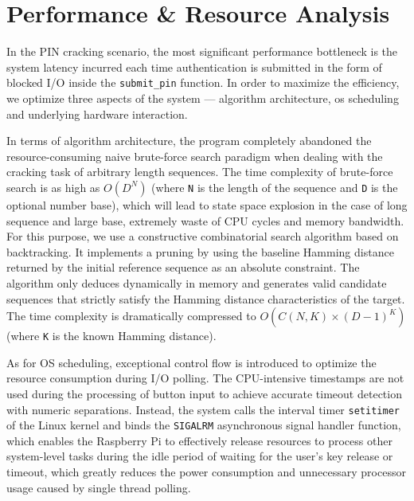 \section{Performance \& Resource Analysis}
\label{sec:performance_analysis}

In the PIN cracking scenario, the most significant performance bottleneck is the system latency incurred each time authentication is submitted in the form of blocked I/O inside the \texttt{submit\_pin} function. In order to maximize the efficiency, we optimize three aspects of the system --- algorithm architecture, os scheduling and underlying hardware interaction.

In terms of algorithm architecture, the program completely abandoned the resource-consuming naive brute-force search paradigm when dealing with the cracking task of arbitrary length sequences. The time complexity of brute-force search is as high as $O(D^N)$ (where \texttt{N} is the length of the sequence and \texttt{D} is the optional number base), which will lead to state space explosion in the case of long sequence and large base, extremely waste of CPU cycles and memory bandwidth. For this purpose, we use a constructive combinatorial search algorithm based on backtracking. It implements   a pruning by using the baseline Hamming distance returned by the initial reference sequence as an absolute constraint. The algorithm only deduces dynamically in memory and generates valid candidate sequences that strictly satisfy the Hamming distance characteristics of the target. The time complexity is dramatically compressed to $O(C(N,K) \times (D-1)^K)$ (where \texttt{K} is the known Hamming distance).

As for OS scheduling, exceptional control flow is introduced to optimize the resource consumption during I/O polling. The CPU-intensive timestamps are not used during the processing of button input to achieve accurate timeout detection with numeric separations. Instead, the system calls the interval timer \texttt{setitimer} of the Linux kernel and binds the \texttt{SIGALRM} asynchronous signal handler function, which enables the Raspberry Pi to effectively release resources to process other system-level tasks during the idle period of waiting for the user's key release or timeout, which greatly reduces the power consumption and unnecessary processor usage caused by single thread polling.

